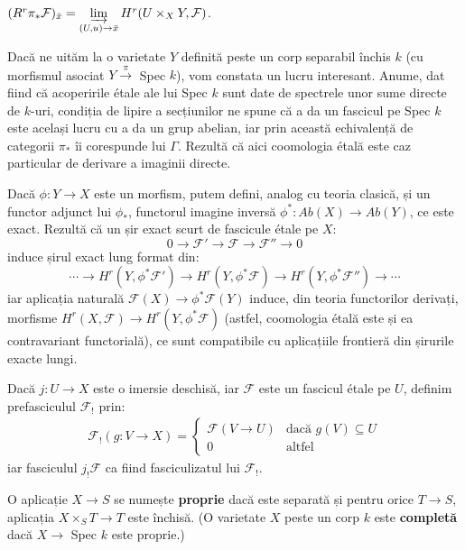 \documentclass[13pt,openany]{book}
\begin{document}
\begin{cor}
$(R^r\pi_*\mathcal{F})_{\bar{x}} = \varinjlim\limits_{(U,u) \rightarrow \bar{x}} H^r(U \times_X Y, \mathcal{F})$.
\end{cor}

Dacă ne uităm la o varietate $Y$ definită peste un corp separabil închis $k$ (cu morfismul asociat $Y \xrightarrow{\pi}$ Spec $k$), vom constata un lucru interesant. Anume, dat fiind că acoperirile étale ale lui Spec $k$ sunt date de spectrele unor sume directe de $k$-uri, condiția de lipire a secțiunilor ne spune că a da un fascicul pe Spec $k$ este același lucru cu a da un grup abelian, iar prin această echivalență de categorii $\pi_*$ îi corespunde lui $\Gamma$. Rezultă că aici coomologia étală este caz particular de derivare a imaginii directe.

Dacă $\phi:Y \rightarrow X$ este un morfism, putem defini, analog cu teoria clasică, și un functor adjunct lui $\phi_*$, functorul imagine inversă $\phi^* : Ab(X) \rightarrow Ab(Y)$, ce este exact. Rezultă că un șir exact scurt de fascicule étale pe $X$:
$$0 \rightarrow \mathcal{F}' \rightarrow \mathcal{F} \rightarrow \mathcal{F}'' \rightarrow 0$$
induce șirul exact lung format din:
$$\cdots \rightarrow H^r(Y,\phi^*\mathcal{F}') \rightarrow H^r(Y,\phi^*\mathcal{F}) \rightarrow H^r(Y,\phi^*\mathcal{F}'') \rightarrow \cdots$$
iar aplicația naturală $\mathcal{F}(X) \rightarrow \phi^*\mathcal{F}(Y)$ induce, din teoria functorilor derivați, morfisme $H^r(X,\mathcal{F}) \rightarrow H^r(Y,\phi^*\mathcal{F})$ (astfel, coomologia étală este și ea contravariant functorială), ce sunt compatibile cu aplicațiile frontieră din șirurile exacte lungi.

Dacă $j :U \rightarrow X$ este o imersie deschisă, iar $\mathcal{F}$ este un fascicul étale pe $U$, definim prefasciculul $\mathcal{F}_!$ prin:
\begin{align*}
\mathcal{F}_!(g: V \rightarrow X) = \left\{
     \begin{array}{lr}
       \mathcal{F}(V \rightarrow U) & \text{dacă } g(V)\subseteq U\\
       0 & \text{altfel}
     \end{array}
   \right.
\end{align*}
iar fasciculul $j_!\mathcal{F}$ ca fiind fasciculizatul lui $\mathcal{F}_!$.

O aplicație $X \rightarrow S$ se numește {\bf proprie} dacă este separată și pentru orice $T \rightarrow S$, aplicația $X \times_S T \rightarrow T$ este închisă. (O varietate $X$ peste un corp $k$ este {\bf completă} dacă $X \rightarrow$ Spec $k$ este proprie.)
\end{document}
